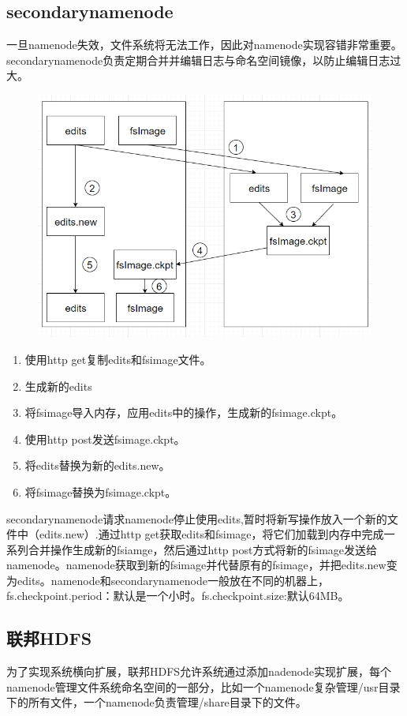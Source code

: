 \documentclass{article}
\begin{document}
	\subsection{secondarynamenode}
	一旦namenode失效，文件系统将无法工作，因此对namenode实现容错非常重要。secondarynamenode负责定期合并并编辑日志与命名空间镜像，以防止编辑日志过大。
	\begin{figure}[h]
		\centering
		\includegraphics[scale=0.4]{1}
	\end{figure}
	\begin{enumerate}
		\item 使用http get复制edits和fsimage文件。
		\item 生成新的edits
		\item 将fsimage导入内存，应用edits中的操作，生成新的fsimage.ckpt。
		\item 使用http post发送fsimage.ckpt。
		\item 将edits替换为新的edits.new。
		\item 将fsimage替换为fsimage.ckpt。
	\end{enumerate}
	secondarynamenode请求namenode停止使用edits,暂时将新写操作放入一个新的文件中（edits.new）.通过http get获取edits和fsimage，将它们加载到内存中完成一系列合并操作生成新的fsiamge，然后通过http post方式将新的fsimage发送给namenode。namenode获取到新的fsimage并代替原有的fsimage，并把edits.new变为edits。namenode和secondarynamenode一般放在不同的机器上，fs.checkpoint.period：默认是一个小时。fs.checkpoint.size:默认64MB。
	 
	\subsection{联邦HDFS}
	为了实现系统横向扩展，联邦HDFS允许系统通过添加nadenode实现扩展，每个namenode管理文件系统命名空间的一部分，比如一个namenode复杂管理/usr目录下的所有文件，一个namenode负责管理/share目录下的文件。
\end{document}
